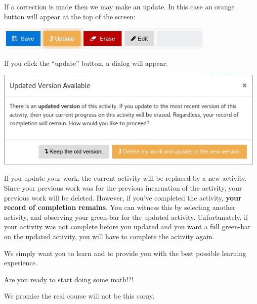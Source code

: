 \documentclass{ximera}
\begin{document}
If a correction is made then we may make an update. In this case an orange button will appear at the top of the screen:
\begin{image}
  \includegraphics{update.png}
\end{image}
If you click the ``update'' button, a dialog will appear:
\begin{image}
  \includegraphics{updateDialog.png}
\end{image}
If you update your work, the current activity will be replaced by a
new activity. Since your previous work was for the previous
incarnation of the activity, your previous work will be
deleted. However, if you've completed the activity, \textbf{your
  record of completion remains}. You can witness this by selecting
another activity, and observing your green-bar for the updated
activity.  Unfortunately, if your activity was not complete before you
updated and you want a full green-bar on the updated activity, you
will have to complete the activity again.


We simply want you to learn and to provide you with the best possible
learning experience.

\begin{problem}
  Are you ready to start doing some math!?!
  \begin{multipleChoice}
  \end{multipleChoice}
  \begin{hint}
    We promise the real course will not be this corny.
  \end{hint}
\end{problem}
\end{document}
